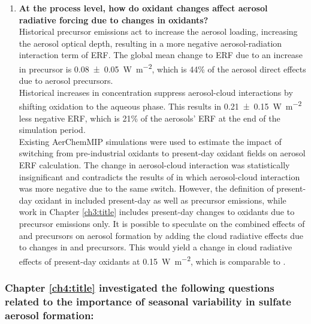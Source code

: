 \begin{enumerate}
         precursors increase the aerosol number concentration in the nucleation mode with slight increases in the aerosol number above 50 nanometers in diameter. \\
        , on the other hand, increases the growth of aerosol size, resulting in the shift of aerosol size to larger diameter and increases the aerosol that activates cloud formation.
        \item \textbf{At the process level, how do oxidant changes affect aerosol radiative forcing due to changes in oxidants?} \\
        Historical  precursor emissions act to increase the aerosol loading, increasing the aerosol optical depth, resulting in a more negative aerosol-radiation interaction term of ERF. The global mean change to ERF due to an increase in  precursor is \qty{0.08+-0.05}{W~m^{-2}}, which is 44\% of the aerosol direct effects due to aerosol precursors. \\
        Historical increases in  concentration suppress aerosol-cloud interactions by shifting oxidation to the aqueous phase. This results in \qty{0.21+-0.15}{W~m^{-2}} less negative ERF, which is 21\% of the aerosols' ERF at the end of the simulation period.\\
        Existing AerChemMIP simulations were used to estimate the impact of switching from pre-industrial oxidants to present-day oxidant fields on aerosol ERF calculation. The change in aerosol-cloud interaction was statistically insignificant and contradicts the results of \citet{karsetStrongImpactsAerosol2018} in which aerosol-cloud interaction was more negative due to the same switch. However, the definition of present-day oxidant in \citet{karsetStrongImpactsAerosol2018} included present-day  as well as  precursor emissions, while work in Chapter \ref{ch3:title} includes present-day changes to oxidants due to  precursor emissions only. It is possible to speculate on the combined effects of  and  precursors on aerosol formation by adding the cloud radiative effects due to changes in  and  precursors. This would yield a change in cloud radiative effects of present-day oxidants at \qty{0.15}{W~m^{-2}}, which is comparable to \citet{karsetStrongImpactsAerosol2018}.
    \end{enumerate}


\subsubsection*{Chapter \ref{ch4:title} investigated the following questions related to the importance of seasonal variability in sulfate aerosol formation:}

